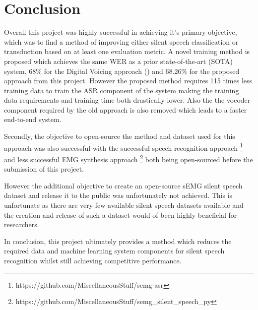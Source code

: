 \chapter{Conclusion} \label{chap:conclusion}

Overall this project was highly successful in achieving it's primary objective,
which was to find a method of improving either silent speech classification
or transduction based on at least one evaluation metric. A novel training
method is proposed which achieves the same WER as a prior state-of-the-art (SOTA)
system, 68\% for the Digital Voicing approach (\cite{gaddy2020digital})
and 68.26\% for the proposed approach from this project.
However the proposed method requires
115 times less training data to train the ASR component of the system
making the training data requirements and training time both drastically lower.
Also the the vocoder component required by the old approach is also removed
which leads to a faster end-to-end system.

Secondly, the objective to open-source the method and dataset used for
this approach was also successful with the successful
speech recognition approach
\footnote{https://github.com/MiscellaneousStuff/semg-asr}
and less successful EMG synthesis approach
\footnote{https://github.com/MiscellaneousStuff/semg\_silent\_speech\_py}
both being open-sourced before the submission of this project.

However the additional objective to create an open-source sEMG silent
speech dataset and release it to the public was unfortunately not achieved.
This is unfortunate as there are very few available silent speech datasets
available and the creation and release of such a dataset would of been
highly beneficial for researchers.

In conclusion, this project ultimately provides a method which reduces
the required data and machine learning system components for silent
speech recognition whilst still achieving competitive performance.